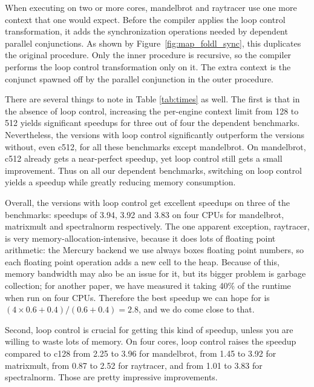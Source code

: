When executing on two or more cores,
mandelbrot and raytracer use one more context that one would expect.
Before the compiler applies the loop control transformation,
it adds the synchronization operations
needed by dependent parallel conjunctions.
As shown by Figure\ \ref{fig:map_foldl_sync},
this duplicates the original procedure.
Only the inner procedure is recursive,
so the compiler performs the loop control transformation only on it.
The extra context is
the conjunct spawned off by the parallel conjunction in the outer procedure.

There are several things to note in Table \ref{tab:times} as well.
The first is that in the absence of loop control,
increasing the per-engine context limit from 128 to 512
yields significant speedups for three out of four the dependent benchmarks.
Nevertheless, the versions with loop control
significantly outperform the versions without, even c512,
for all these benchmarks except mandelbrot.
On mandelbrot, c512 already gets a near-perfect speedup,
yet loop control still gets a small improvement.
Thus on all our dependent benchmarks,
switching on loop control yields a speedup
while greatly reducing memory consumption.

Overall, the versions with loop control
get excellent speedups on three of the benchmarks:
speedups of 3.94, 3.92 and 3.83 on four CPUs
for mandelbrot, matrixmult and spectralnorm respectively.
The one apparent exception, raytracer,
is very memory-allocation-intensive,
because it does lots of floating point arithmetic:
the Mercury backend we use always boxes floating point numbers,
so each floating point operation adds a new cell to the heap.
Because of this, memory bandwidth may also be an issue for it,
but its bigger problem is garbage collection;
for another paper,
we have measured it taking 40\% of the runtime when run on four CPUs.
Therefore the best speedup we can hope for is
$(4 \times 0.6 + 0.4)/(0.6 + 0.4) = 2.8$,
and we do come close to that.

Second,
loop control is crucial for getting this kind of speedup,
unless you are willing to waste lots of memory.
On four cores, loop control raises the speedup compared to c128
from 2.25 to 3.96 for mandelbrot,
from 1.45 to 3.92 for matrixmult,
from 0.87 to 2.52 for raytracer,
and from 1.01 to 3.83 for spectralnorm.
Those are pretty impressive improvements.

